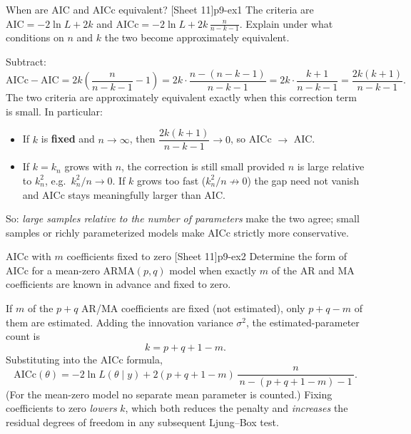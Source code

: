 \begin{exercise}{When are AIC and AICc equivalent? \quad\textnormal{[Sheet 11]}}{p9-ex1}
The criteria are
$\mathrm{AIC}=-2\ln L+2k$ and
$\mathrm{AICc}=-2\ln L+2k\,\frac{n}{n-k-1}$.
Explain under what conditions on $n$ and $k$ the two become approximately
equivalent.
\end{exercise}
\begin{solution}
Subtract:
\[
\mathrm{AICc}-\mathrm{AIC}
= 2k\!\left(\frac{n}{n-k-1}-1\right)
= 2k\cdot\frac{n-(n-k-1)}{n-k-1}
= 2k\cdot\frac{k+1}{n-k-1}
= \frac{2k(k+1)}{n-k-1}.
\]
The two criteria are approximately equivalent exactly when this correction term
is small. In particular:
\begin{itemize}
  \item If $k$ is \textbf{fixed} and $n\to\infty$, then
        $\dfrac{2k(k+1)}{n-k-1}\to 0$, so AICc $\to$ AIC.
  \item If $k=k_n$ grows with $n$, the correction is still small provided $n$ is
        large relative to $k_n^2$, e.g.\ $k_n^2/n\to0$. If $k$ grows too fast
        ($k_n^2/n\not\to0$) the gap need not vanish and AICc stays meaningfully
        larger than AIC.
\end{itemize}
So: \emph{large samples relative to the number of parameters} make the two
agree; small samples or richly parameterized models make AICc strictly more
conservative.
\end{solution}

\begin{exercise}{AICc with $m$ coefficients fixed to zero \quad\textnormal{[Sheet 11]}}{p9-ex2}
Determine the form of AICc for a mean-zero ARMA$(p,q)$ model when exactly $m$ of
the AR and MA coefficients are known in advance and fixed to zero.
\end{exercise}
\begin{solution}
If $m$ of the $p+q$ AR/MA coefficients are fixed (not estimated), only $p+q-m$
of them are estimated. Adding the innovation variance $\sigma^2$, the
estimated-parameter count is
\[
k = p+q+1-m .
\]
Substituting into the AICc formula,
\[
\mathrm{AICc}(\theta)
= -2\ln L(\theta\mid y)
+ 2(p+q+1-m)\,\frac{n}{\,n-(p+q+1-m)-1\,}.
\]
(For the mean-zero model no separate mean parameter is counted.) Fixing
coefficients to zero \emph{lowers} $k$, which both reduces the penalty and
\emph{increases} the residual degrees of freedom in any subsequent Ljung--Box
test.
\end{solution}

